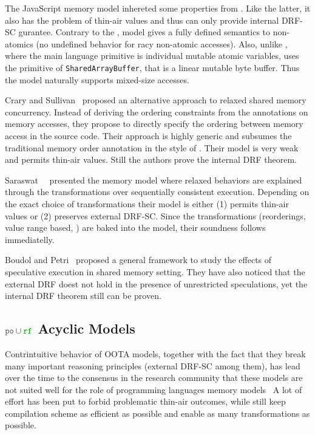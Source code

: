 The JavaScript memory model \JSMM inhereted some properties from \CMM.
Like the latter, it also has the problem of thin-air values
and thus can only provide internal DRF-SC gurantee. 
Contrary to the \CMM, \JS model gives a fully defined 
semantics to non-atomics 
(\ie no undefined behavior for racy non-atomic accesses).  
Also, unlike \CMM, where the main language primitive is 
individual mutable atomic variables, \JSMM uses 
the primitive of \texttt{SharedArrayBuffer},
that is a linear mutable byte buffer.
Thus the model naturally supports mixed-size accesses.

Crary and Sullivan~\cite{Crary-Sullivan:POPL15} proposed 
an alternative approach to relaxed shared memory concurrency.
Instead of deriving the ordering constraints from the annotations 
on memory accesses, they propose to directly specify 
the ordering between memory access in the source code. 
Their approach is highly generic and subsumes 
the traditional memory order annotation in the style of \CMM.
Their model is very weak and permits thin-air values. 
Still the authors prove the internal DRF theorem.

Saraswat~\etal~\cite{Saraswat-el:PPoPP07} presented the \RAO memory model
where relaxed behaviors are explained through the transformations 
over sequentially consistent execution.
Depending on the exact choice of transformations 
their model is either (1) permits thin-air values or 
(2) preserves external DRF-SC. 
Since the transformations (\eg reorderings, value range based, \etc)
are baked into the model, their soundness follows immediatelly.  

Boudol and Petri~\cite{Boudol-Petri:ESOP10} proposed a general 
framework to study the effects of speculative execution in
shared memory setting. 
They have also noticed that the external DRF doest not 
hold in the presence of unrestricted speculations, 
yet the internal DRF theorem still can be proven. 

\subsection{$\lPO\cup\lRF$ Acyclic Models}
\label{sec:porf-acyc}

Contrintuitive behavior of OOTA models, together with the fact that they break 
many important reasoning principles (external DRF-SC among them), 
has lead over the time to the consensus in the research community that these models 
are not suited well for the role of 
programming languages memory models~\cite{Boehm-Demsky:MSPC14, Batty-al:ESOP15}
A lot of effort has been put to forbid problematic 
thin-air outcomes, while still keep compilation scheme as efficient as possible
and enable as many transformations as possible.


